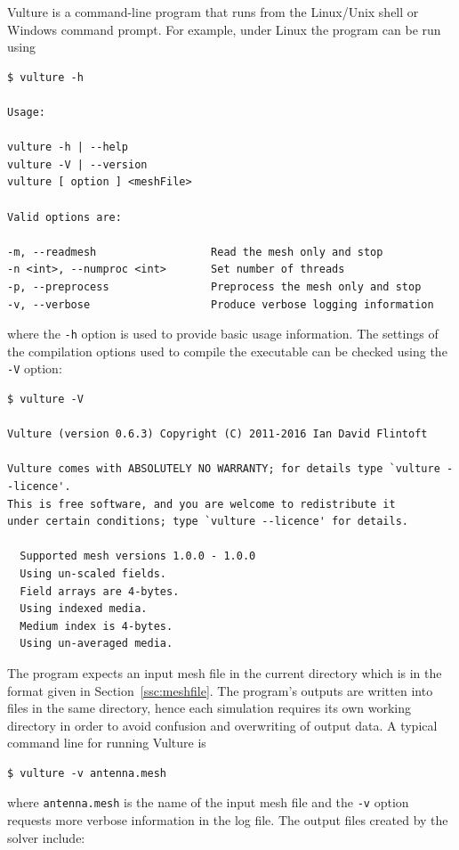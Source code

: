 \documentclass[onecolumn,a4paper]{article}
\numberwithin{equation}{section}
\begin{document}
Vulture is a command-line program that runs from the Linux/Unix shell or Windows command prompt.
For example, under Linux the program can be run using 
\begin{verbatim}
$ vulture -h

Usage:

vulture -h | --help
vulture -V | --version
vulture [ option ] <meshFile>

Valid options are:

-m, --readmesh                  Read the mesh only and stop
-n <int>, --numproc <int>       Set number of threads
-p, --preprocess                Preprocess the mesh only and stop
-v, --verbose                   Produce verbose logging information
\end{verbatim}
where the \texttt{-h} option is used to provide basic usage information. The 
settings of the compilation options used to compile the executable can be checked
using the \texttt{-V} option:
\begin{verbatim}
$ vulture -V

Vulture (version 0.6.3) Copyright (C) 2011-2016 Ian David Flintoft

Vulture comes with ABSOLUTELY NO WARRANTY; for details type `vulture --licence'.
This is free software, and you are welcome to redistribute it
under certain conditions; type `vulture --licence' for details.

  Supported mesh versions 1.0.0 - 1.0.0
  Using un-scaled fields.
  Field arrays are 4-bytes.
  Using indexed media.
  Medium index is 4-bytes.
  Using un-averaged media.

\end{verbatim}
The program expects an input mesh file in the current directory which is in the format given in Section~\ref{ssc:meshfile}. 
The program's outputs are
written into files in the same directory, hence each simulation requires its own working directory in order
to avoid confusion and overwriting of output data. A typical command line for running Vulture is
\begin{verbatim}
$ vulture -v antenna.mesh
\end{verbatim}
where \texttt{antenna.mesh} is the name of the input mesh file and the \texttt{-v} option requests more
verbose information in the log file. The output files created by the solver include:
\end{document}
